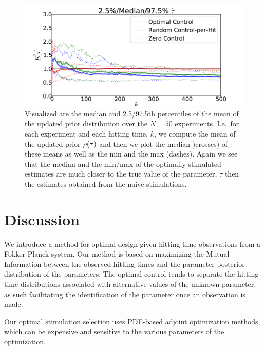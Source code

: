 \documentclass{article}
\begin{document}
\begin{figure}[htp]
\begin{center}
  \includegraphics[width=\textwidth]{Figs/HTOnlineEstimator/online_updated_prior_quantiles_mean_per_experiment.pdf}
  \caption[Quantiles of the Mean Estimates]{Visualized are the median and
  2.5/97.5th percentiles of the mean of the updated prior
  distribution over the $N=50$ experiments. I.e.\ for each experiment and each
  hitting time, $k$, we compute the mean of the updated prior $\rho({ \tau })$ and then we plot the median
  )crosses) of these means as well as the min and the max (dashes). Again we see
  that the median and the min/max of the optimally stimulated estimates are much closer to the
  true value of the parameter, $\tau$ then the estimates obtained from the
  naive stimulations.}
  \label{fig:online_optimization_quantiles_belief_evolution}
\end{center}
\end{figure}

\section{Discussion}
\label{sec:discussion}
We introduce a method for optimal design given hitting-time observations from a
Fokker-Planck system. Our method is based on maximizing the Mutual Information
between the observed hitting times and the parameter posterior distribution
of the parameters. The optimal control tends to separate
the hitting-time distributions associated with alternative values of the unknown
parameter, as such facilitating the identification of the parameter once an
observation is made. 

Our optimal stimulation selection uses PDE-based adjoint
optimization methods, which can be expensive and sensitive to the various
parameters of the optimization. 
\end{document}
